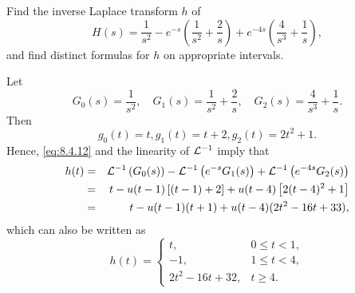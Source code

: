 \documentclass{ximera}
\begin{document}
\begin{example}\label{example:8.4.7}
 Find the inverse Laplace transform $h$ of
$$
H(s)=\frac{1}{s^2}-e^{-s}\left(\frac{1}{s^2}+\frac{2}{s}\right)+
e^{-4s}\left(\frac{4}{s^3}+\frac{1}{s}\right),
$$
and find distinct formulas for $h$ on appropriate intervals.
\begin{explanation}
Let
$$
G_0(s)=\frac{1}{s^2},\quad G_1(s)=\frac{1}{s^2}+\frac{2}{s},\quad
G_2(s)=\frac{4}{s^3}+\frac{1}{ s}.
$$
Then
$$
g_0(t)=t, g_1(t)=t+2, g_2(t)=2t^2+1.
$$
Hence, \eqref{eq:8.4.12} and the linearity of ${\cal L}^{-1}$ imply that
\begin{eqnarray*}
h(t)&=&{\cal L}^{-1}\left(G_0(s)\right)-{\cal
L}^{-1}\left(e^{-s}G_1(s)\right)+{\cal
L}^{-1}\left(e^{-4s}G_2(s)\right)\\
&=&t-u(t-1)\left[(t-1)+2\right]+u(t-4)\left[2(t-4)^2+1\right]\\
&=&t-u(t-1)(t+1)+u(t-4)(2t^2-16t+33),
\end{eqnarray*}
which can also be written as
$$
h(t)=\left\{\begin{array}{cl}
 t,&0\leq t<1,\\
-1,&1\leq t<4,\\
2t^2-16t+32,&t\geq 4.
\end{array}\right.
$$
\end{explanation}
\end{example}
\end{document}
